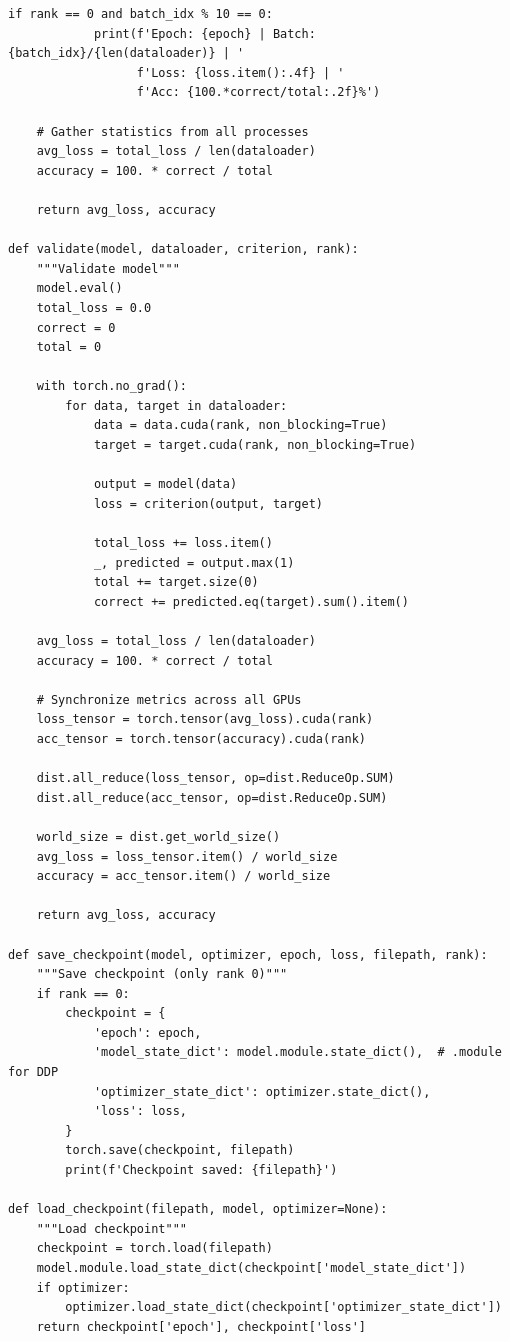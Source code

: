 \begin{lstlisting}[style=python, caption=Complete PyTorch DDP implementation]
        if rank == 0 and batch_idx % 10 == 0:
            print(f'Epoch: {epoch} | Batch: {batch_idx}/{len(dataloader)} | '
                  f'Loss: {loss.item():.4f} | '
                  f'Acc: {100.*correct/total:.2f}%')

    # Gather statistics from all processes
    avg_loss = total_loss / len(dataloader)
    accuracy = 100. * correct / total

    return avg_loss, accuracy

def validate(model, dataloader, criterion, rank):
    """Validate model"""
    model.eval()
    total_loss = 0.0
    correct = 0
    total = 0

    with torch.no_grad():
        for data, target in dataloader:
            data = data.cuda(rank, non_blocking=True)
            target = target.cuda(rank, non_blocking=True)

            output = model(data)
            loss = criterion(output, target)

            total_loss += loss.item()
            _, predicted = output.max(1)
            total += target.size(0)
            correct += predicted.eq(target).sum().item()

    avg_loss = total_loss / len(dataloader)
    accuracy = 100. * correct / total

    # Synchronize metrics across all GPUs
    loss_tensor = torch.tensor(avg_loss).cuda(rank)
    acc_tensor = torch.tensor(accuracy).cuda(rank)

    dist.all_reduce(loss_tensor, op=dist.ReduceOp.SUM)
    dist.all_reduce(acc_tensor, op=dist.ReduceOp.SUM)

    world_size = dist.get_world_size()
    avg_loss = loss_tensor.item() / world_size
    accuracy = acc_tensor.item() / world_size

    return avg_loss, accuracy

def save_checkpoint(model, optimizer, epoch, loss, filepath, rank):
    """Save checkpoint (only rank 0)"""
    if rank == 0:
        checkpoint = {
            'epoch': epoch,
            'model_state_dict': model.module.state_dict(),  # .module for DDP
            'optimizer_state_dict': optimizer.state_dict(),
            'loss': loss,
        }
        torch.save(checkpoint, filepath)
        print(f'Checkpoint saved: {filepath}')

def load_checkpoint(filepath, model, optimizer=None):
    """Load checkpoint"""
    checkpoint = torch.load(filepath)
    model.module.load_state_dict(checkpoint['model_state_dict'])
    if optimizer:
        optimizer.load_state_dict(checkpoint['optimizer_state_dict'])
    return checkpoint['epoch'], checkpoint['loss']


\end{lstlisting}
